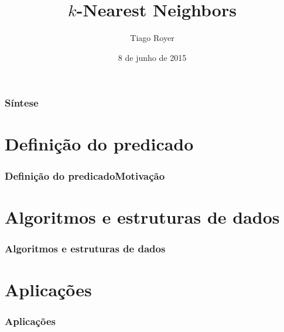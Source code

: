 \documentclass[utf8]{beamer}
\begin{document}
\author{Tiago Royer}
\title{$k$-Nearest Neighbors}
\date{8 de junho de 2015}
\begin{frame}
    \titlepage
\end{frame}

\begin{frame}
    \frametitle{Síntese}
    \tableofcontents
\end{frame}

\section{Definição do predicado}

\begin{frame}
    \frametitle{Definição do predicadoMotivação}
\end{frame}

\section{Algoritmos e estruturas de dados}

\begin{frame}
    \frametitle{Algoritmos e estruturas de dados}
\end{frame}

\section{Aplicações}
\begin{frame}
    \frametitle{Aplicações}
\end{frame}
\end{document}
